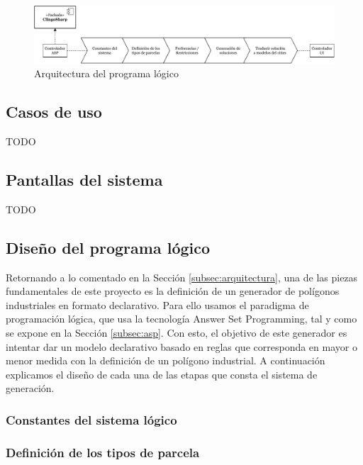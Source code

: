 \begin{figure}[!h]
	\centering
	\includegraphics[width=\textwidth]{images/arquitectura-asp}
	\caption{Arquitectura del programa lógico}
	\label{fig:arquitectura-asp}
\end{figure}

\subsection{Casos de uso}
\label{subsec:cases}

TODO

\subsection{Pantallas del sistema}
\label{subsec:mockups}

TODO

\subsection{Diseño del programa lógico}
\label{subsubsec:generator}

Retornando a lo comentado en la Sección \ref{subsec:arquitectura}, una de las piezas fundamentales de este proyecto es la definición de un generador de polígonos industriales en formato declarativo. Para ello usamos el paradigma de programación lógica, que usa la tecnología Answer Set Programming, tal y como se expone en la Sección \ref{subsec:asp}. Con esto, el objetivo de este generador es intentar dar un modelo declarativo basado en reglas que corresponda en mayor o menor medida con la definición de un polígono industrial. A continuación explicamos el diseño de cada una de las etapas que consta el sistema de generación.

\subsubsection{Constantes del sistema lógico}

\subsubsection{Definición de los tipos de parcela}

